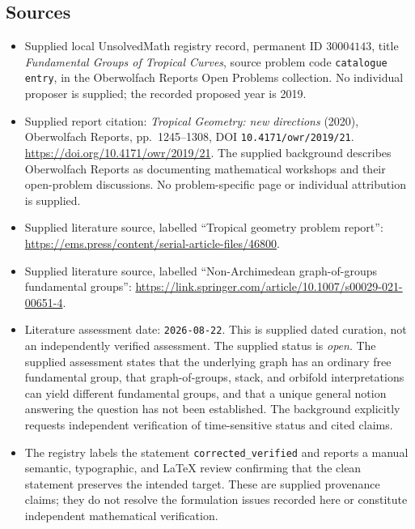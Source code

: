 \documentclass[11pt]{article}
\begin{document}
\subsection{Sources}
\begin{itemize}
\item Supplied local UnsolvedMath registry record, permanent ID \(30004143\), title \emph{Fundamental Groups of Tropical Curves}, source problem code \texttt{catalogue entry}, in the Oberwolfach Reports Open Problems collection. No individual proposer is supplied; the recorded proposed year is 2019.
\item Supplied report citation: \emph{Tropical Geometry: new directions} (2020), Oberwolfach Reports, pp.\ 1245--1308, DOI \texttt{10.4171/owr/2019/21}. \url{https://doi.org/10.4171/owr/2019/21}. The supplied background describes Oberwolfach Reports as documenting mathematical workshops and their open-problem discussions. No problem-specific page or individual attribution is supplied.
\item Supplied literature source, labelled ``Tropical geometry problem report'': \url{https://ems.press/content/serial-article-files/46800}.
\item Supplied literature source, labelled ``Non-Archimedean graph-of-groups fundamental groups'': \url{https://link.springer.com/article/10.1007/s00029-021-00651-4}.
\item Literature assessment date: \texttt{2026-08-22}. This is supplied dated curation, not an independently verified assessment. The supplied status is \emph{open}. The supplied assessment states that the underlying graph has an ordinary free fundamental group, that graph-of-groups, stack, and orbifold interpretations can yield different fundamental groups, and that a unique general notion answering the question has not been established. The background explicitly requests independent verification of time-sensitive status and cited claims.
\item The registry labels the statement \texttt{corrected\_verified} and reports a manual semantic, typographic, and LaTeX review confirming that the clean statement preserves the intended target. These are supplied provenance claims; they do not resolve the formulation issues recorded here or constitute independent mathematical verification.
\end{itemize}
\end{document}
